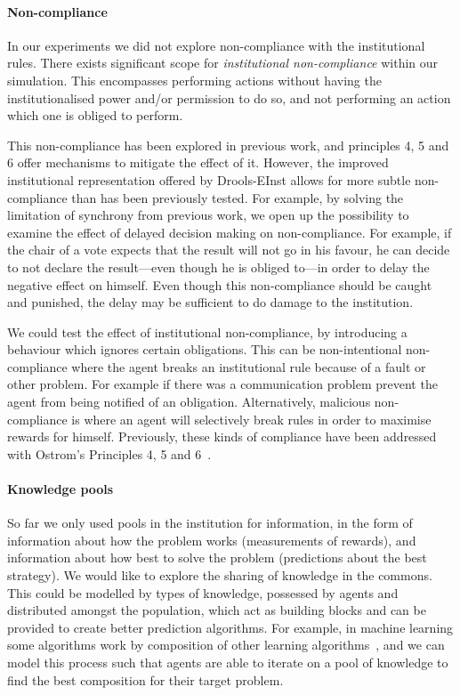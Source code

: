 \paragraph{Non-compliance} 
In our experiments we did not explore non-compliance with the institutional rules.
There exists significant scope for \emph{institutional non-compliance} within our
simulation. This encompasses performing actions without having the institutionalised
power and/or permission to do so, and not performing an action which one is
obliged to perform.

This non-compliance has been explored in previous work, and principles
4, 5 and 6 offer mechanisms to mitigate the effect of it. However, the
improved institutional representation offered by Drools-EInst allows for more
subtle non-compliance than has been previously tested. For example, by solving
the limitation of synchrony from previous work, we open up the possibility to
examine the effect of delayed decision making on non-compliance. For example,
if the chair of a vote expects that the result will not go in his favour, he
can decide to not declare the result---even though he is obliged to---in order to delay
the negative effect on himself. Even though this non-compliance should be
caught and punished, the delay may be sufficient to do damage to the
institution.

We could test the effect of
institutional non-compliance, by introducing a behaviour which ignores certain
obligations. This can be non-intentional non-compliance where the agent
breaks an institutional rule because of a fault or other problem. For example
if there was a communication problem prevent the agent from being notified of
an obligation. Alternatively, malicious non-compliance is where an agent will
selectively break rules in order to maximise rewards for himself. Previously,
these kinds of compliance have been addressed with Ostrom's Principles 4, 5 and
6~\citep{Pitt2012b}. 

\paragraph{Knowledge pools} So far we only used pools in the institution for
information, in the form of information about how the problem works
(measurements of rewards), and information about how best to solve the problem
(predictions about the best strategy). We would like to explore the sharing of
knowledge in the commons. This could be modelled by types of knowledge,
possessed by agents and distributed amongst the population, which act as
building blocks and can be provided to create better prediction algorithms.
For example, in machine learning some algorithms work by composition of other
learning algorithms~\citep{Opitz1999}, and we can model this process such
that agents are able to iterate on a pool of knowledge to find the best
composition for their target problem.

